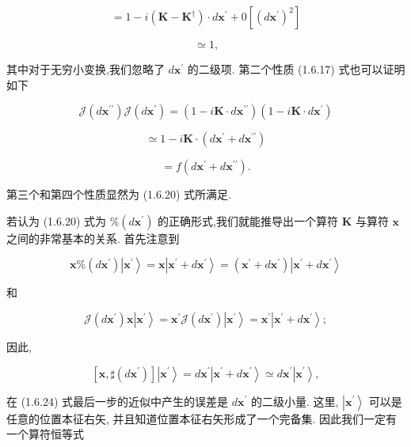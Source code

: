 \documentclass[lang=cn,newtx,10pt,scheme=chinese,thmcnt=section]{elegantbook}
\begin{document}
$$
= 1 - i\left( {\mathbf{K} - {\mathbf{K}}^{ \dagger }}\right) \cdot d{\mathbf{x}}^{\prime } + 0\left\lbrack {\left( d{\mathbf{x}}^{\prime }\right) }^{2}\right\rbrack \tag{1.6.21}
$$

$$
\simeq 1\text{,}
$$

其中对于无穷小变换,我们忽略了 $d{\mathbf{x}}^{\prime }$ 的二级项. 第二个性质 (1.6.17) 式也可以证明如下

$$
\mathcal{J}\left( {d{\mathbf{x}}^{\prime \prime }}\right) \mathcal{J}\left( {d{\mathbf{x}}^{\prime }}\right) = \left( {1 - i\mathbf{K} \cdot d{\mathbf{x}}^{\prime \prime }}\right) \left( {1 - i\mathbf{K} \cdot d{\mathbf{x}}^{\prime }}\right)
$$

$$
\simeq 1 - i\mathbf{K} \cdot \left( {d{\mathbf{x}}^{\prime } + d{\mathbf{x}}^{\prime \prime }}\right) \tag{1.6.22}
$$

$$
= f\left( {d{\mathbf{x}}^{\prime } + d{\mathbf{x}}^{\prime \prime }}\right) .
$$

第三个和第四个性质显然为 (1.6.20) 式所满足.

若认为 (1.6.20) 式为 $\% \left( {d{\mathbf{x}}^{\prime }}\right)$ 的正确形式,我们就能推导出一个算符 $\mathbf{K}$ 与算符 $\mathbf{x}$ 之间的非常基本的关系. 首先注意到

$$
\mathbf{x}\% \left( {d{\mathbf{x}}^{\prime }}\right) \left| {\mathbf{x}}^{\prime }\right\rangle = \mathbf{x}\left| {{\mathbf{x}}^{\prime } + d{\mathbf{x}}^{\prime }}\right\rangle = \left( {{\mathbf{x}}^{\prime } + d{\mathbf{x}}^{\prime }}\right) \left| {{\mathbf{x}}^{\prime } + d{\mathbf{x}}^{\prime }}\right\rangle \tag{1.6.23a}
$$

和

$$
\mathcal{J}\left( {d{\mathbf{x}}^{\prime }}\right) \mathbf{x}\left| {\mathbf{x}}^{\prime }\right\rangle = {\mathbf{x}}^{\prime }\mathcal{J}\left( {d{\mathbf{x}}^{\prime }}\right) \left| {\mathbf{x}}^{\prime }\right\rangle = {\mathbf{x}}^{\prime }\left| {{\mathbf{x}}^{\prime } + d{\mathbf{x}}^{\prime }}\right\rangle ; \tag{1.6.23b}
$$

因此,

$$
\left\lbrack {\mathbf{x},\sharp \left( {d{\mathbf{x}}^{\prime }}\right) }\right\rbrack \left| {\mathbf{x}}^{\prime }\right\rangle = d{\mathbf{x}}^{\prime }\left| {{\mathbf{x}}^{\prime } + d{\mathbf{x}}^{\prime }}\right\rangle \simeq d{\mathbf{x}}^{\prime }\left| {\mathbf{x}}^{\prime }\right\rangle , \tag{1.6.24}
$$

在 (1.6.24) 式最后一步的近似中产生的误差是 $d{\mathbf{x}}^{\prime }$ 的二级小量. 这里, $\left| {\mathbf{x}}^{\prime }\right\rangle$ 可以是任意的位置本征右矢, 并且知道位置本征右矢形成了一个完备集. 因此我们一定有一个算符恒等式
\end{document}
